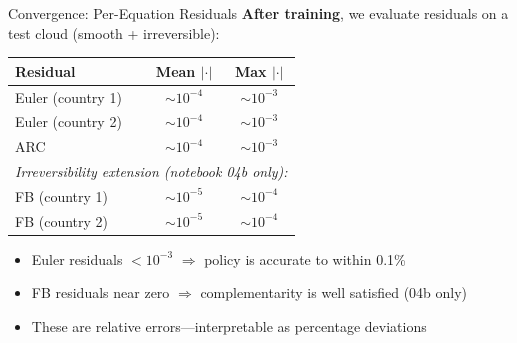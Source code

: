 \documentclass[aspectratio=169,11pt]{beamer}
\newcommand{\emphc}[1]{\textcolor{harvardcrimson}{#1}}
\begin{document}
\begin{frame}{Convergence: Per-Equation Residuals}
\textbf{After training}, we evaluate residuals on a test cloud (smooth + irreversible):

\vspace{0.5em}
\begin{center}
\begin{tabular}{lcc}
\toprule
\textbf{Residual} & \textbf{Mean $|\cdot|$} & \textbf{Max $|\cdot|$} \\
\midrule
Euler (country 1) & $\sim 10^{-4}$ & $\sim 10^{-3}$ \\
Euler (country 2) & $\sim 10^{-4}$ & $\sim 10^{-3}$ \\
ARC & $\sim 10^{-4}$ & $\sim 10^{-3}$ \\
\midrule
\multicolumn{3}{l}{\textit{Irreversibility extension (notebook 04b only):}} \\
FB (country 1) & $\sim 10^{-5}$ & $\sim 10^{-4}$ \\
FB (country 2) & $\sim 10^{-5}$ & $\sim 10^{-4}$ \\
\bottomrule
\end{tabular}
\end{center}

\vspace{0.3em}
\begin{itemize}
    \item Euler residuals $< 10^{-3}$ $\Rightarrow$ policy is accurate to within 0.1\%
    \item FB residuals near zero $\Rightarrow$ complementarity is well satisfied (04b only)
    \item These are \emphc{relative errors}---interpretable as percentage deviations
\end{itemize}
\end{frame}
\end{document}
